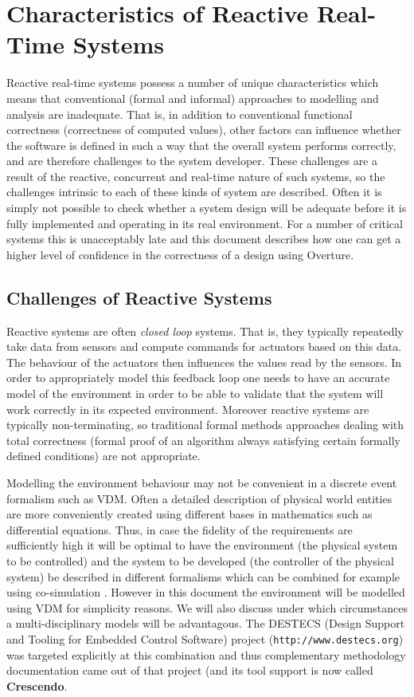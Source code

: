 \documentclass{overturerepchap}
\newcommand{\url}[1]{\texttt{#1}}
\begin{document}
\section{Characteristics of Reactive Real-Time Systems}

Reactive real-time systems possess a number of unique characteristics
which means that conventional (formal and informal) approaches to
modelling and analysis are inadequate. That is, in addition to
conventional functional correctness (correctness of computed values),
other factors can influence whether the software is defined in such a
way that the overall system performs correctly, and are therefore
challenges to the system developer. These challenges are a result of
the reactive, concurrent and real-time nature of such systems, so the
challenges intrinsic to each of these kinds of system are
described. Often it is simply not possible to check whether a system
design will be adequate before it is fully implemented and operating
in its real environment. For a number of critical systems this is
unacceptably late and this document describes how one can get a higher
level of confidence in the correctness of a design using Overture.

\subsection{Challenges of Reactive Systems}

Reactive systems are often \emph{closed loop} systems. That is, they
typically repeatedly take data from sensors and compute commands for
actuators based on this data. The behaviour of the actuators then
influences the values read by the sensors. In order to appropriately
model this feedback loop one needs to have an accurate model of the
environment in order to be able to validate that the system will work
correctly in its expected environment. Moreover reactive systems are
typically non-terminating, so traditional formal methods approaches
dealing with total correctness (formal proof of an algorithm always 
satisfying certain formally defined conditions) are not appropriate. 

Modelling the environment behaviour may not be convenient in a
discrete event formalism such as VDM. Often a detailed description of
physical world entities are more conveniently created using different
bases in mathematics such as differential equations. Thus, in case the
fidelity of the requirements are sufficiently high it will be optimal
to have the environment (the physical system to be controlled) and the
system to be developed (the controller of the physical system) be
described in different formalisms which can be combined for example
using co-simulation \cite{Broenink&10,Fitzgerald&13b}. However in this document the
environment will be modelled using VDM for simplicity reasons. We will
also discuss under which circumstances a multi-disciplinary models
will be advantagous. The DESTECS (Design Support and Tooling for
Embedded Control Software) project (\url{http://www.destecs.org}) was
targeted explicitly at this combination and thus
complementary methodology documentation came out of that project (and its tool
support is now called \textbf{Crescendo}.
\end{document}
